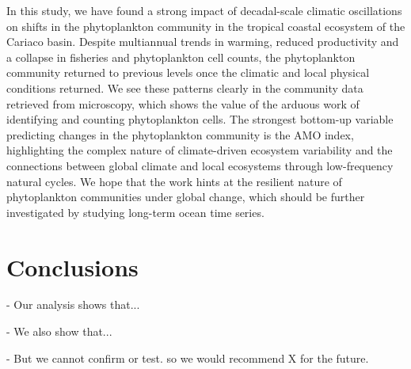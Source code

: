 \documentclass[draft]{agujournal2019}
\begin{document}
In this study, we have found a strong impact of decadal-scale climatic oscillations on shifts in the phytoplankton community in the tropical coastal ecosystem of the Cariaco basin. Despite multiannual trends in warming, reduced productivity and a collapse in fisheries and phytoplankton cell counts, the phytoplankton community returned to previous levels once the climatic and local physical conditions returned. We see these patterns clearly in the community data retrieved from microscopy, which shows the value of the arduous work of identifying and counting phytoplankton cells. The strongest bottom-up variable predicting changes in the phytoplankton community is the AMO index, highlighting the complex nature of climate-driven ecosystem variability and the connections between global climate and local ecosystems through low-frequency natural cycles. We hope that the work hints at the resilient nature of phytoplankton communities under global change, which should be further investigated by studying long-term ocean time series.






\section{Conclusions}

- Our analysis shows that...

- We also show that...

- But we cannot confirm or test. so we would recommend X for the future.










%
%
\end{document}
